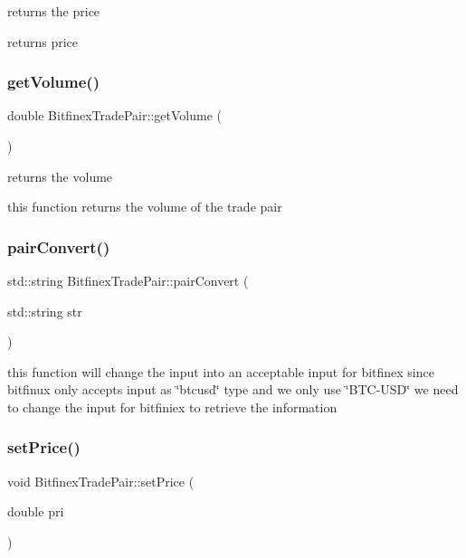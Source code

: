 returns the price 

returns price \mbox{\label{class_bitfinex_trade_pair_aa0e8da551d808f9d64be6f322120777e}} 
\subsubsection{\texorpdfstring{get\+Volume()}{getVolume()}}
{\footnotesize\ttfamily double Bitfinex\+Trade\+Pair\+::get\+Volume (\begin{DoxyParamCaption}{ }\end{DoxyParamCaption})}



returns the volume 

this function returns the volume of the trade pair \mbox{\label{class_bitfinex_trade_pair_a2c772425f29358b17e38f2c35fcdb69f}} 
\subsubsection{\texorpdfstring{pair\+Convert()}{pairConvert()}}
{\footnotesize\ttfamily std\+::string Bitfinex\+Trade\+Pair\+::pair\+Convert (\begin{DoxyParamCaption}\item[{std\+::string}]{str }\end{DoxyParamCaption})}

this function will change the input into an acceptable input for bitfinex since bitfinux only accepts input as \char`\"{}btcusd\char`\"{} type and we only use \char`\"{}\+B\+T\+C-\/\+U\+S\+D\char`\"{} we need to change the input for bitfiniex to retrieve the information \mbox{\label{class_bitfinex_trade_pair_ada35f305bafd57ad58cabf20241bec7f}} 
\subsubsection{\texorpdfstring{set\+Price()}{setPrice()}}
{\footnotesize\ttfamily void Bitfinex\+Trade\+Pair\+::set\+Price (\begin{DoxyParamCaption}\item[{double}]{pri }\end{DoxyParamCaption})}



